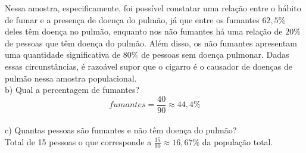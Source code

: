 Nessa amostra, especificamente, foi possível constatar uma relação entre o hábito de fumar e a presença de doença do pulmão, já que entre os fumantes $62,5\%$ deles têm doença no pulmão, enquanto nos não fumantes há uma relação de $20\%$ de pessoas que têm doença do pulmão. Além disso, os não fumantes apresentam uma quantidade significativa de $80\%$ de pessoas sem doença pulmonar. Dadas essas circunstâncias, é razoável supor que o cigarro é o causador de doenças de pulmão nessa amostra populacional.\\

b) Qual a percentagem de fumantes?
\\

\[
    fumantes = \frac{40}{90} \approx 44,4 \%
\]
\\

c) Quantas pessoas são fumantes e não têm doença do pulmão?
\\

Total de 15 pessoas o que corresponde a $\frac{15}{90} \approx 16,67\% $ da população total.
\\


